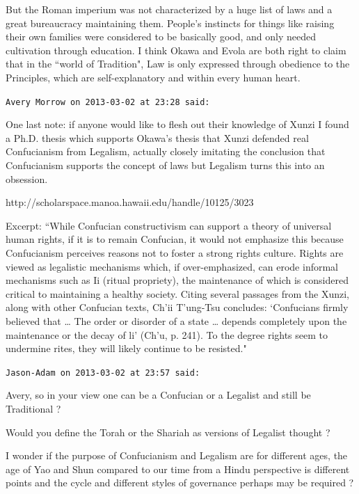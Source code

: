 \begin{footnotesize}
\begin{sffamily}
But the Roman imperium was not characterized by a huge list of laws and a great bureaucracy maintaining them. People's instincts for things like raising their own families were considered to be basically good, and only needed cultivation through education. I think Okawa and Evola are both right to claim that in the ``world of Tradition", Law is only expressed through obedience to the Principles, which are self-explanatory and within every human heart.


\hfill

\texttt{Avery Morrow on 2013-03-02 at 23:28 said: }

One last note: if anyone would like to flesh out their knowledge of Xunzi I found a Ph.D. thesis which supports Okawa's thesis that Xunzi defended real Confucianism from Legalism, actually closely imitating the conclusion that Confucianism supports the concept of laws but Legalism turns this into an obsession.

http://scholarspace.manoa.hawaii.edu/handle/10125/3023

Excerpt: ``While Confucian constructivism can support a theory of universal human rights, if it is to remain Confucian, it would not emphasize this because Confucianism perceives reasons not to foster a strong rights culture. Rights are viewed as legalistic mechanisms which, if over-emphasized, can erode informal mechanisms such as Ii (ritual propriety), the maintenance of which is considered critical to maintaining a healthy society. Citing several passages from the Xunzi, along with other Confucian texts, Ch'ii T'ung-Tsu concludes: `Confucians firmly believed that … The order or disorder of a state … depends completely upon the maintenance or the decay of li' (Ch'u, p. 241). To the degree rights seem to undermine rites, they will likely continue to be resisted."


\hfill

\texttt{Jason-Adam on 2013-03-02 at 23:57 said: }

Avery, so in your view one can be a Confucian or a Legalist and still be Traditional ?

Would you define the Torah or the Shariah as versions of Legalist thought ?

I wonder if the purpose of Confucianism and Legalism are for different ages, the age of Yao and Shun compared to our time from a Hindu perspective is different points and the cycle and different styles of governance perhaps may be required ?


\hfill


\end{sffamily}
\end{footnotesize}
